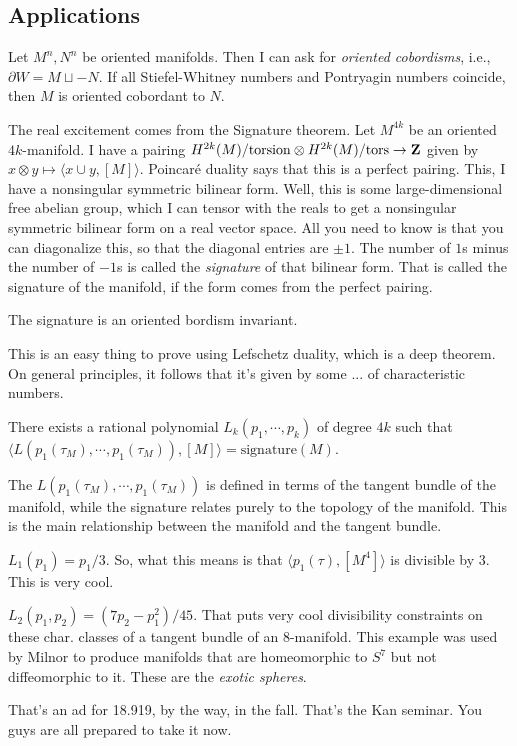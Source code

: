 \subsection{Applications}
\begin{theorem}[Wall]
    Let $M^n,N^n$ be oriented manifolds.
    Then I can ask for \emph{oriented cobordisms}, i.e., $\partial W = M\sqcup -N$.
    If all Stiefel-Whitney numbers and Pontryagin numbers coincide, then $M$ is oriented cobordant to $N$.
\end{theorem}
The real excitement comes from the Signature theorem.
Let $M^{4k}$ be an oriented $4k$-manifold.
I have a pairing $H^{2k}(M)/\mathrm{torsion}\otimes H^{2k}(M)/\mathrm{tors}\to \mathbf Z$ given by $x\otimes y\mapsto\langle x\cup y,[M]\rangle$.
Poincar\'e duality says that this is a perfect pairing.
This, I have a nonsingular symmetric bilinear form.
Well, this is some large-dimensional free abelian group, which I can tensor with the reals to get a nonsingular symmetric bilinear form on a real vector space.
All you need to know is that you can diagonalize this, so that the diagonal entries are $\pm 1$.
The number of $1$s minus the number of $-1$s is called the \emph{signature} of that bilinear form.
That is called the signature of the manifold, if the form comes from the perfect pairing.
\begin{lemma}[Thom]
    The signature is an oriented bordism invariant.
\end{lemma}
This is an easy thing to prove using Lefschetz duality, which is a deep theorem.
On general principles, it follows that it's given by some ... of characteristic numbers.
\begin{theorem}
    There exists a rational polynomial $L_k(p_1,\cdots,p_k)$ of degree $4k$ such that $\langle L(p_1(\tau_M),\cdots,p_1(\tau_M)),[M]\rangle = \mathrm{signature}(M)$.
\end{theorem}
The $L(p_1(\tau_M),\cdots,p_1(\tau_M))$ is defined in terms of the tangent bundle of the manifold, while the signature relates purely to the topology of the manifold.
This is the main relationship between the manifold and the tangent bundle.
\begin{example}
    $L_1(p_1) = p_1/3$.
    So, what this means is that $\langle p_1(\tau),[M^4]\rangle$ is divisible by $3$.
    This is very cool.
\end{example}
\begin{example}
    $L_2(p_1,p_2) = (7p_2 - p_1^2)/45$.
    That puts very cool divisibility constraints on these char. classes of a tangent bundle of an $8$-manifold.
    This example was used by Milnor to produce manifolds that are homeomorphic to $S^7$ but not diffeomorphic to it.
    These are the \emph{exotic spheres}.
\end{example}
That's an ad for 18.919, by the way, in the fall.
That's the Kan seminar.
You guys are all prepared to take it now.
